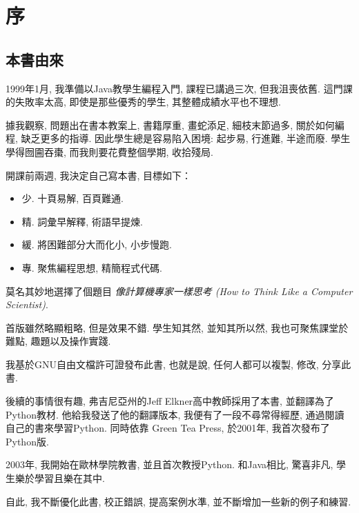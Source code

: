 \documentclass[10pt]{book}
\begin{document}
\fi


\chapter{序}

\section*{本書由來}

1999年1月, 我準備以Java教學生編程入門, 
課程已講過三次, 但我沮喪依舊. 
這門課的失敗率太高, 即使是那些優秀的學生, 其整體成績水平也不理想.

據我觀察, 問題出在書本教案上, 
書籍厚重, 畫蛇添足, 細枝末節過多, 關於如何編程, 缺乏更多的指導.
因此學生總是容易陷入困境: 起步易, 行進難, 半途而廢.
學生學得囫圇吞棗, 而我則要花費整個學期, 收拾殘局.

開課前兩週, 我決定自己寫本書, 目標如下：

\begin{itemize}

\item 少. 十頁易解, 百頁難通.

\item 精. 詞彙早解釋, 術語早提煉.

\item 緩. 將困難部分大而化小, 小步慢跑.

\item 專. 聚焦編程思想, 精簡程式代碼.

\end{itemize}

莫名其妙地選擇了個題目 {\em 像計算機專家一樣思考
(How to Think Like a Computer Scientist)}.

首版雖然略顯粗略, 但是效果不錯. 
學生知其然, 並知其所以然, 我也可聚焦課堂於難點, 趣題以及操作實踐. 

我基於GNU自由文檔許可證發布此書, 
也就是說, 任何人都可以複製, 修改, 分享此書. 

後續的事情很有趣, 弗吉尼亞州的Jeff Elkner高中教師採用了本書, 
並翻譯為了Python教材. 他給我發送了他的翻譯版本, 
我便有了一段不尋常得經歷, 通過閱讀自己的書來學習Python.  
同時依靠 Green Tea Press, 於2001年, 我首次發布了Python版. 

2003年, 我開始在歐林學院教書, 並且首次教授Python. 
和Java相比, 驚喜非凡, 學生樂於學習且樂在其中. 

自此, 我不斷優化此書, 校正錯誤, 提高案例水準, 
並不斷增加一些新的例子和練習. 
\end{document}
